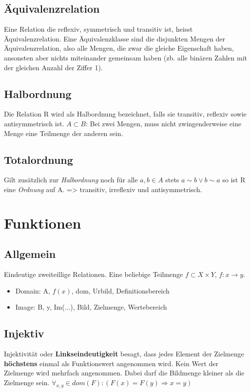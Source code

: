 \documentclass[a4paper,DIV10,12pt,headsepline,smallheadings,halfparskip-]{scrreprt}
\begin{document}
	\subsection{Äquivalenzrelation}
	Eine Relation die reflexiv, symmetrisch und transitiv ist, heisst
        Äquivalenzrelation.\newline
        Eine Äquivalenzklasse sind die disjunkten Mengen der Äquivalenzrelation, also alle Mengen, die zwar die gleiche Eigenschaft haben, ansonsten aber nichts miteinander gemeinsam haben (zb. alle binären Zahlen mit der gleichen Anzahl der Ziffer 1).

	\subsection{Halbordnung}
	Die Relation R wird als Halbordnung bezeichnet, falls sie transitiv,
        reflexiv sowie antisymmetrisch ist.\newline
        \(A \subset B\): Bei zwei Mengen, muss nicht zwingenderweise eine Menge
        eine Teilmenge der anderen sein.
	
	\subsection{Totalordnung}
	Gilt zusätzlich zur \emph{Halbordnung} noch für alle \(a,b \in A\)
        stets \(a \sim b \vee b \sim a\) so ist R eine \emph{Ordnung} auf A. =>
        transitiv, irreflexiv und antisymmetrisch.
        
	\section{Funktionen}
    \subsection{Allgemein}
        Eindeutige zweiteillige Relationen. Eine beliebige Teilmenge \(f
        \subset X \times Y \), \(f: x \rightarrow y \).\newline
        \begin{itemize}
          \item Domain: A, \(f(x)\), dom, Urbild, Definitionsbereich
          \item Image: B, y, Im(...), Bild, Zielmenge, Wertebereich
        \end{itemize}

	\subsection{Injektiv}
	Injektivität oder \textbf{Linkseindeutigkeit} besagt, dass jedes
        Element der Zielmenge \textbf{höchstens} einmal als Funktionswert angenommen
        wird. Kein Wert der Zielmenge wird mehrfach angenommen. Dabei darf die Bildmenge kleiner als die Zielmenge sein.\newline
	\( \forall_{x,y} \in dom(F): (F(x) = F(y) \Rightarrow x = y) \)
	
\end{document}
